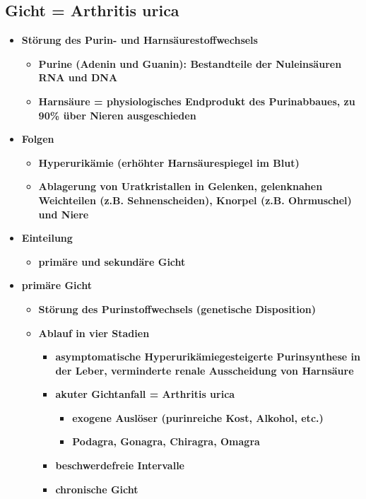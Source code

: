 \subsection{Gicht = Arthritis urica}
	\begin{itemize}
		\item \textbf{Störung des Purin- und Harnsäurestoffwechsels}
			\begin{itemize}
				\item \textbf{Purine (Adenin und Guanin): Bestandteile der Nuleinsäuren RNA und DNA}
				\item \textbf{Harnsäure = physiologisches Endprodukt des Purinabbaues, zu 90\% über Nieren ausgeschieden}
			\end{itemize}
		\item \textbf{Folgen}
			\begin{itemize}
				\item \textbf{Hyperurikämie (erhöhter Harnsäurespiegel im Blut)}
				\item \textbf{Ablagerung von Uratkristallen in Gelenken, gelenknahen Weichteilen (z.B. Sehnenscheiden), Knorpel (z.B. Ohrmuschel) und Niere}
			\end{itemize}
		\item \textbf{Einteilung}
			\begin{itemize}
				\item \textbf{primäre und sekundäre Gicht}
			\end{itemize}
		\item \textbf{primäre Gicht}
			\begin{itemize}
				\item \textbf{Störung des Purinstoffwechsels (genetische Disposition)}
				\item \textbf{Ablauf in vier Stadien}
					\begin{itemize}
						\item \textbf{asymptomatische Hyperurikämiegesteigerte Purinsynthese in der Leber, verminderte renale Ausscheidung von Harnsäure}
						\item \textbf{akuter Gichtanfall = Arthritis urica}
							\begin{itemize}
								\item \textbf{exogene Auslöser (purinreiche Kost, Alkohol, etc.)}
								\item \textbf{Podagra, Gonagra, Chiragra, Omagra}
							\end{itemize}
						\item \textbf{beschwerdefreie Intervalle}
						\item \textbf{chronische Gicht}

\end{itemize}
\end{itemize}
\end{itemize}
